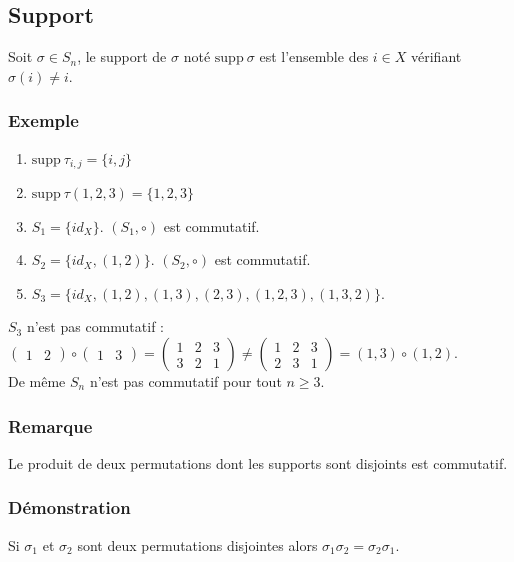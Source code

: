 \documentclass[a4paper,10pt]{book} %
\newcommand{\supp}{\mathrm{supp}~} %
\begin{document}
\subsection{Support}
Soit $\sigma \in S_n$, le support de $\sigma$ noté $\supp \sigma$ est l'ensemble des $i\in X$ vérifiant $\sigma(i)\neq i$.

\subsubsection{Exemple}
\begin{enumerate}
\item $\supp\tau_{i,j}=\{i,j\}$
\item $\supp\tau(1,2,3)=\{1,2,3\}$
\item $S_1=\{id_X\}$. $(S_1,\circ)$ est commutatif.
\item $S_2=\{id_X,(1,2)\}$. $(S_2,\circ)$ est commutatif.
\item $S_3=\{id_X,(1,2),(1,3), (2,3), (1,2,3), (1,3,2)\}$.
\end{enumerate}

$S_3$ n'est pas commutatif : $\begin{pmatrix}1&2\end{pmatrix}\circ \begin{pmatrix}1&3\end{pmatrix}=\begin{pmatrix}
1&2&3\\3&2&1\end{pmatrix}\neq \begin{pmatrix}1&2&3\\2&3&1\end{pmatrix}=(1,3)\circ(1,2)$.\\

De même $S_n$ n'est pas commutatif pour tout $n\geq 3$.

\newpage

\subsubsection{Remarque}
Le produit de deux permutations dont les supports sont disjoints est commutatif.\\

\subsubsection{Démonstration}
Si $\sigma_1$ et $\sigma_2$ sont deux permutations disjointes alors $\sigma_1\sigma_2=\sigma_2\sigma_1$.\\
\end{document}
